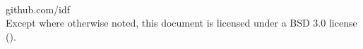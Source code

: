 \onecolumn
\begin{titlepage}
\\
\end{titlepage}

\newpage
\noindent {} github.com/idf \\
Except where otherwise noted, this document is licensed under a BSD 3.0
license ().
